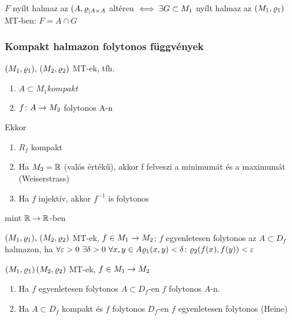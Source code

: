 \begin{megj}
  $F$ nyílt halmaz az $(A, \varrho_{|A\times A}$ altéren $\iff \exists
  G\subset M_1$ nyílt halmaz az $(M_1,\varrho_1)$ MT-ben: $F = A \cap G$ 
\end{megj}
\subsubsection{Kompakt halmazon folytonos függvények}

\begin{te}
  $(M_1,\varrho_1),\,(M_2,\varrho_2)$ MT-ek, tfh.
  \begin{enumerate}
  \item $A\subset M_1 kompakt$
  \item $f\colon A\to M_2$ folytonos A-n
  \end{enumerate}
  Ekkor
  \begin{enumerate}
  \item $R_f$ kompakt
  \item Ha $M_2=\mathbb{R}$ (valós értékű), akkor f felveszi a minimumát és a
    maximumát (Weiserstrass)
  \item Ha $f$ injektív, akkor $f^{-1}$ is folytonos
  \end{enumerate}
\end{te}
\begin{biz}
  mint $\mathbb{R}\to\mathbb{R}$-ben
\end{biz}

\begin{de}
  $(M_1,\varrho_1),\,(M_2,\varrho_2)$ MT-ek, $f\in M_1\to M_2$;
  $f$ egyenletesen folytonos az $A\subset D_f$ halmazon, ha $\forall
  \varepsilon >0\ \exists \delta >0\ \forall x,y\in A \varrho_1(x,y) < \delta
  \colon \varrho_2(f(x), f(y)) < \varepsilon$ 
\end{de}

\begin{te}
  $(M_1, \varrho_1)\,(M_2,\varrho_2)$ MT-ek, $f\in M_1\to M_2$
  \begin{enumerate}
  \item Ha $f$ egyenletesen folytonos $A\subset D_f$-en \nn $f$
    folytonos $A$-n.			
  \item Ha $A\subset D_f$ kompakt és $f$ folytonos $D_f$-en \nn $f$
    egyenletesen folytonos (Heine)					
  \end{enumerate}
\end{te}

